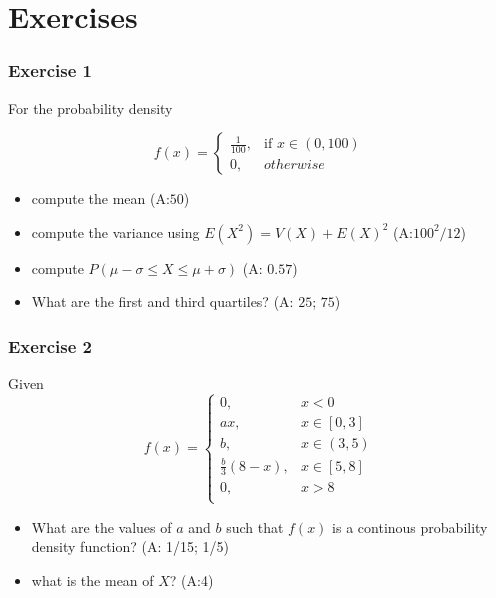 \documentclass[
]{book}
\providecommand{\tightlist}{%
  \setlength{\itemsep}{0pt}\setlength{\parskip}{0pt}}
\begin{document}
\hypertarget{exercises-4}{%
\section{Exercises}\label{exercises-4}}

\hypertarget{exercise-1-3}{%
\subsubsection{Exercise 1}\label{exercise-1-3}}

For the probability density

\[
    f(x)= 
\begin{cases}
    \frac{1}{100},& \text{if } x\in (0,100)\\
    0,& otherwise 
\end{cases}
\]

\begin{itemize}
\tightlist
\item
  compute the mean (A:\(50\))
\item
  compute the variance using \(E(X^2)=V(X)+E(X)^2\) (A:\(100^2/12\))
\item
  compute \(P(\mu-\sigma\leq X \leq \mu+\sigma)\) (A: \(0.57\))
\item
  What are the first and third quartiles? (A: \(25\); \(75\))
\end{itemize}

\hypertarget{exercise-2-3}{%
\subsubsection{Exercise 2}\label{exercise-2-3}}

Given
\[
    f(x)= 
\begin{cases}
0, & x < 0 \\
ax, & x \in [0,3] \\
b, & x \in (3,5) \\
\frac{b}{3}(8-x),& x \in [5,8]\\
0, & x > 8 \\
\end{cases}
\]

\begin{itemize}
\item
  What are the values of \(a\) and \(b\) such that \(f(x)\) is a continous probability density function? (A: 1/15; 1/5)
\item
  what is the mean of \(X\)? (A:4)
\end{itemize}
\end{document}
